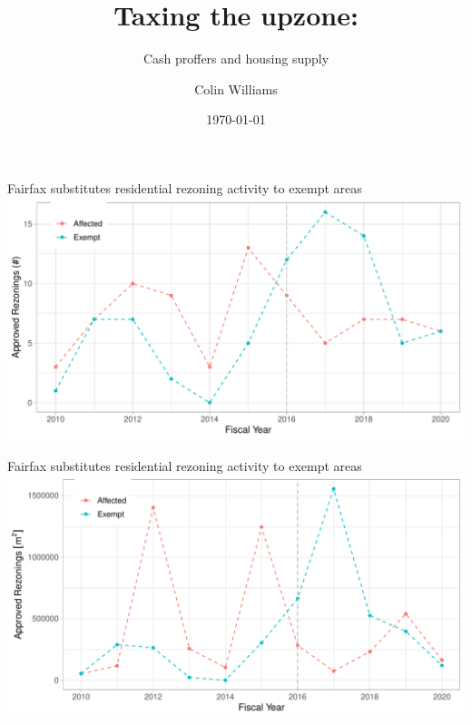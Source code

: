 \documentclass[10pt]{beamer}
\title{Taxing the upzone:}
\subtitle{Cash proffers and housing supply}
\date{\today}
\author{Colin Williams}
\institute{University of Virginia}
\begin{document}
\maketitle

\begin{frame}{Fairfax substitutes residential rezoning activity to exempt areas}
    \includegraphics[width=\textwidth]{figures/fairfax/plot_fairfax_exempt_counts.pdf}
\end{frame}

\begin{frame}{Fairfax substitutes residential rezoning activity to exempt areas}
    \includegraphics[width=\textwidth]{figures/fairfax/plot_fairfax_exempt_areas.pdf}
\end{frame}
\end{document}
